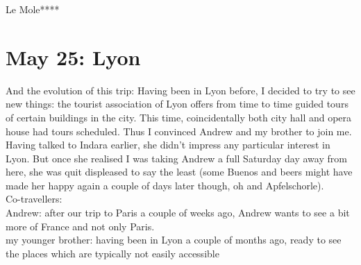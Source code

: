 Le Mole****

\section{May 25: Lyon}
\label{Lyon2013}

And the evolution of this trip: Having been in Lyon before, I decided to try to see new things: the tourist association of Lyon offers from time to time guided tours of certain buildings in the city. This time, coincidentally both city hall and opera house had tours scheduled. Thus I convinced Andrew and my brother to join me. Having talked to Indara earlier, she didn't impress any particular interest in Lyon. But once she realised I was taking Andrew a full Saturday day away from here, she was quit displeased to say the least (some Buenos and beers might have made her happy again a couple of days later though, oh and Apfelschorle).\\

Co-travellers:\\
Andrew: after our trip to Paris a couple of weeks ago, Andrew wants to see a bit more of France and not only Paris.\\
my younger brother: having been in Lyon a couple of months ago, ready to see the places which are typically not easily accessible\\

